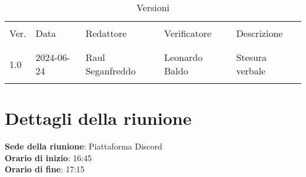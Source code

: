 \documentclass[italian,12pt]{article}
\begin{document}


\newpage



\begin{table}[!h]
	\caption{Versioni}
	\footnotesize
	\begin{center}
		\begin{tabular}{ l l l l p{6cm} }
			\hline                                                                           \\[-2ex]
			Ver. & Data       & Redattore       & Verificatore       & Descrizione           \\
			\\[-2ex] \hline \\[-1.5ex]
			1.0  & 2024-06-24 & Raul Seganfreddo & Leonardo Baldo & Stesura verbale \\
			\\[-1.5ex] \hline
		\end{tabular}
	\end{center}
\end{table}

\newpage

\tableofcontents

\newpage

\section{Dettagli della riunione}


\textbf{Sede della riunione}: Piattaforma Discord\\
\textbf{Orario di inizio}: 16:45\\
\textbf{Orario di fine}: 17:15\\
\end{document}
